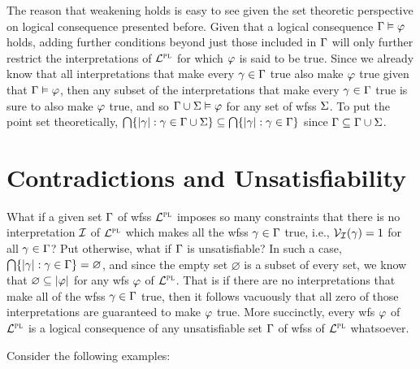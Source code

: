 The reason that weakening holds is easy to see given the set theoretic perspective on logical consequence presented before.
Given that a logical consequence $\Gamma \vDash \varphi$ holds, adding further conditions beyond just those included in $\Gamma$ will only further restrict the interpretations of $\mathcal{L}^{\textsc{pl}}$ for which $\varphi$ is said to be true. 
Since we already know that all interpretations that make every $\gamma \in \Gamma$ true also make $\varphi$ true given that $\Gamma \vDash \varphi$, then any subset of the interpretations that make every $\gamma \in \Gamma$ true is sure to also make $\varphi$ true, and so $\Gamma \cup \Sigma \vDash \varphi$ for any set of wfss $\Sigma$.
To put the point set theoretically, $\bigcap \lbrace \lvert\gamma\rvert : \gamma \in \Gamma \cup \Sigma\rbrace \subseteq \bigcap \lbrace \lvert\gamma\rvert : \gamma \in \Gamma\rbrace$ since $\Gamma \subseteq \Gamma \cup \Sigma$. 







\section{Contradictions and Unsatisfiability}
  \label{sec:ContradictionUnsat}

What if a given set $\Gamma$ of wfss $\mathcal{L}^{\textsc{pl}}$ imposes so many constraints that there is no interpretation $\mathcal{I}$ of $\mathcal{L}^{\textsc{pl}}$ which makes all the wfss $\gamma \in \Gamma$ true, i.e., $\mathcal{V}_{\mathcal{I}}(\gamma) = 1$ for all $\gamma \in \Gamma$? 
Put otherwise, what if $\Gamma$ is unsatisfiable? 
In such a case, $\bigcap \lbrace \lvert\gamma\rvert : \gamma \in \Gamma\rbrace = \varnothing$, and since the empty set $\varnothing$ is a subset of every set, we know that $\varnothing \subseteq \lvert\varphi\rvert$ for any wfs $\varphi$ of $\mathcal{L}^{\textsc{pl}}$. 
That is if there are no interpretations that make all of the wfss $\gamma \in \Gamma$ true, then it follows vacuously that all zero of those interpretations are guaranteed to make $\varphi$ true.
More succinctly, every wfs $\varphi$ of $\mathcal{L}^{\textsc{pl}}$ is a logical consequence of any unsatisfiable set $\Gamma$ of wfss of $\mathcal{L}^{\textsc{pl}}$ whatsoever.

Consider the following examples:

\begin{earg} \label{contra}
\end{earg}

